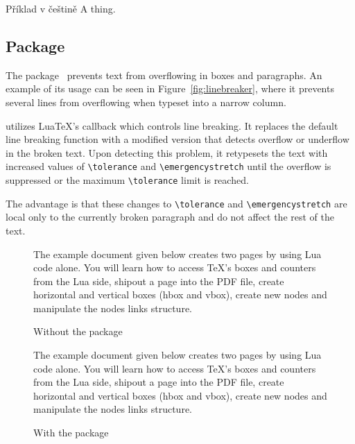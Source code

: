 \documentclass{ltugboat}
\begin{document}
{\preventsingledebugon

\noindent Příklad v češtině
A thing.

\preventsingledebugoff

\subsection{ Package}

\newcommand\testbox[1]{%
  \parbox{120pt}{%
    \parindent=15pt%
    \tolerance=1%
    \pretolerance=1%
    #1
  }%
}

\newcommand\printtest[1]{%
  \linebreakerdisable%
  \begin{subfigure}[b]{.45\textwidth}
    \centering
  \noindent\testbox{%
    #1
  }%
  \caption{Without the \tbcode{Linebreaker} package}
  \end{subfigure}
  \linebreakerenable%
  \hfill%
  \begin{subfigure}[b]{.45\textwidth}
    \centering
  \testbox{%
    #1
  }%
  \medskip
  \caption{With the \tbcode{Linebreaker} package}
  \end{subfigure}
}

The  package~\cite{linebreaker} prevents text from
overflowing in boxes and paragraphs. An example of its usage can be seen in
Figure~\ref{fig:linebreaker}, where it prevents several lines from overflowing
when typeset into a narrow column.

 utilizes  Lua\TeX's callback 
which controls line breaking. It replaces the default line
breaking function with a modified version that detects overflow or underflow in
the broken text. Upon detecting this problem, it retypesets the text with
increased values of \verb|\tolerance| and \verb|\emergencystretch| until the
overflow is suppressed or the maximum \verb|\tolerance| limit is reached.

The advantage is that these changes to \verb|\tolerance| and
\verb|\emergencystretch| are local only to the currently broken paragraph and
do not affect the rest of the text.

\begin{figure*}
  \printtest{
The example document given below creates two pages by using Lua code alone. You
will learn how to access TeX's boxes and counters from the Lua side, shipout a
page into the PDF file, create horizontal and vertical boxes (hbox and vbox),
create new nodes and manipulate the nodes links structure. 
  }
  \caption{Example of using the  package}
  \label{fig:linebreaker}
\end{figure*}

}
\end{document}
